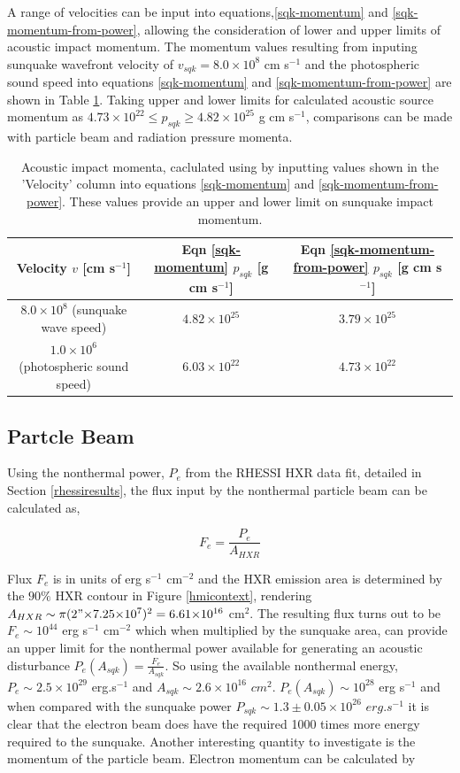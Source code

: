 A range of velocities can be input into equations,\ref{sqk-momentum} and \ref{sqk-momentum-from-power}, allowing the consideration of lower and upper limits of acoustic impact momentum. The momentum values resulting from inputing sunquake wavefront velocity of $v_{sqk} = 8.0{\times}10^{8}$ cm s$^{-1}$ \citep{2014ApJ...796...85J} and the photospheric sound speed into equations \ref{sqk-momentum} and \ref{sqk-momentum-from-power} are shown in Table \ref{sqk-momenta}. Taking upper and lower limits for calculated acoustic source momentum as $4.73{\times}10^{22} \leq p_{sqk} \geq 4.82{\times}10^{25}$ g cm s$^{-1}$, comparisons can be made with particle beam and radiation pressure momenta.\\
\begin{table}[h]
\centering
\begin{tabular}{|c|c|c|}
Velocity $v$ [cm s$^{-1}$] & Eqn \ref{sqk-momentum} $p_{sqk}$ [g cm s$^{-1}$] & Eqn \ref{sqk-momentum-from-power} $p_{sqk}$ [g cm s$^{-1}$]\\
\hline
$8.0{\times}10^{8}$ (sunquake wave speed) & $4.82{\times}10^{25}$ & $3.79{\times}10^{25}$\\
$1.0{\times}10^{6}$ (photospheric sound speed) & $6.03{\times}10^{22}$ & $4.73{\times}10^{22}$\\
\end{tabular}
\caption{Acoustic impact momenta, caclulated using by inputting values shown in the 'Velocity' column into equations \ref{sqk-momentum} and \ref{sqk-momentum-from-power}. These values provide an upper and lower limit on sunquake impact momentum.}\label{sqk-momenta}
\end{table}


\subsection{Partcle Beam}
Using the nonthermal power, $P_{e}$ from the RHESSI HXR data fit, detailed in Section \ref{rhessiresults}, the flux input by the nonthermal particle beam can be calculated as,

\begin{equation}\label{electronflux}
F_e = \frac{P_{e}}{A_{HXR}}
\end{equation}

Flux $F_e$ is in units of erg s$^{-1}$ cm$^{-2}$ and the HXR emission area is determined by the $90\%$ HXR contour in Figure \ref{hmicontext}, rendering $A_{HXR} \sim \pi (2"{\times}7.25{\times}10^{7})^{2} = 6.61{\times}10^{16}$ cm$^{2}$. The resulting flux turns out to be $F_e \sim 10^{44}$ erg s$^{-1}$ cm$^{-2}$ which when multiplied by the sunquake area, can provide an upper limit for the nonthermal power available for generating an acoustic disturbance $P_{e}(A_{sqk}) = \frac{F_e}{A_{sqk}}$. So using the available nonthermal energy, $P_e \sim 2.5{\times}10^{29}$ erg.s$^{-1}$ and $A_{sqk} \sim 2.6{\times}10^{16}$ $cm^{2}$. $P_{e}(A_{sqk}) \sim 10^{28}$ erg s$^{-1}$ and when compared with the sunquake power $P_{sqk} \sim 1.3\pm0.05{\times}10^{26}$ $erg.s^{-1}$ it is clear that the electron beam does have the required 1000 times more energy required to the sunquake. Another interesting quantity to investigate is the momentum of the particle beam. Electron momentum can be calculated by 


